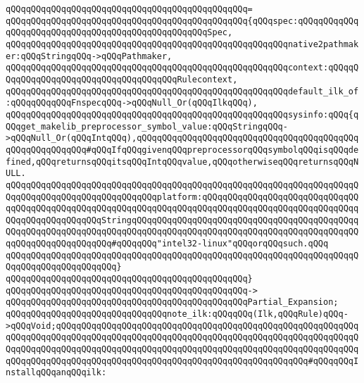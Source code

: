 \verb|qQQqqQQqqQQqqQQqqQQqqQQqqQQqqQQqqQQqqQQqqQQqqQQq=|\newline
\verb|qQQqqQQqqQQqqQQqqQQqqQQqqQQqqQQqqQQqqQQqqQQqqQQq{qQQqspec:qQQqqQQqqQQqqQQqqQQqqQQqqQQqqQQqqQQqqQQqqQQqqQQqqQQqSpec,|\newline
\verb|qQQqqQQqqQQqqQQqqQQqqQQqqQQqqQQqqQQqqQQqqQQqqQQqqQQqqQQqnative2pathmaker:qQQqStringqQQq->qQQqPathmaker,|\newline
\verb|qQQqqQQqqQQqqQQqqQQqqQQqqQQqqQQqqQQqqQQqqQQqqQQqqQQqqQQqcontext:qQQqqQQqqQQqqQQqqQQqqQQqqQQqqQQqqQQqqQQqRulecontext,|\newline
\verb|qQQqqQQqqQQqqQQqqQQqqQQqqQQqqQQqqQQqqQQqqQQqqQQqqQQqqQQqdefault_ilk_of:qQQqqQQqqQQqFnspecqQQq->qQQqNull_Or(qQQqIlkqQQq),|\newline
\newline
\verb|qQQqqQQqqQQqqQQqqQQqqQQqqQQqqQQqqQQqqQQqqQQqqQQqqQQqqQQqsysinfo:qQQq{qQQqget_makelib_preprocessor_symbol_value:qQQqStringqQQq->qQQqNull_Or(qQQqIntqQQq),qQQqqQQqqQQqqQQqqQQqqQQqqQQqqQQqqQQqqQQqqQQqqQQqqQQqqQQqqQQq#qQQqIfqQQqgivenqQQqpreprocessorqQQqsymbolqQQqisqQQqdefined,qQQqreturnsqQQqitsqQQqIntqQQqvalue,qQQqotherwiseqQQqreturnsqQQqNULL.|\newline
\verb|qQQqqQQqqQQqqQQqqQQqqQQqqQQqqQQqqQQqqQQqqQQqqQQqqQQqqQQqqQQqqQQqqQQqqQQqqQQqqQQqqQQqqQQqqQQqqQQqqQQqplatform:qQQqqQQqqQQqqQQqqQQqqQQqqQQqqQQqqQQqqQQqqQQqqQQqqQQqqQQqqQQqqQQqqQQqqQQqqQQqqQQqqQQqqQQqqQQqqQQqqQQqqQQqqQQqqQQqqQQqqQQqStringqQQqqQQqqQQqqQQqqQQqqQQqqQQqqQQqqQQqqQQqqQQqqQQqqQQqqQQqqQQqqQQqqQQqqQQqqQQqqQQqqQQqqQQqqQQqqQQqqQQqqQQqqQQqqQQqqQQqqQQqqQQqqQQqqQQqqQQq#qQQqqQQq"intel32-linux"qQQqorqQQqsuch.qQQq|\newline
\verb|qQQqqQQqqQQqqQQqqQQqqQQqqQQqqQQqqQQqqQQqqQQqqQQqqQQqqQQqqQQqqQQqqQQqqQQqqQQqqQQqqQQqqQQqqQQq}|\newline
\verb|qQQqqQQqqQQqqQQqqQQqqQQqqQQqqQQqqQQqqQQqqQQqqQQq}|\newline
\verb|qQQqqQQqqQQqqQQqqQQqqQQqqQQqqQQqqQQqqQQqqQQqqQQq->|\newline
\verb|qQQqqQQqqQQqqQQqqQQqqQQqqQQqqQQqqQQqqQQqqQQqqQQqPartial_Expansion;|\newline
\newline
\verb|qQQqqQQqqQQqqQQqqQQqqQQqqQQqqQQqnote_ilk:qQQqqQQq(Ilk,qQQqRule)qQQq->qQQqVoid;qQQqqQQqqQQqqQQqqQQqqQQqqQQqqQQqqQQqqQQqqQQqqQQqqQQqqQQqqQQqqQQqqQQqqQQqqQQqqQQqqQQqqQQqqQQqqQQqqQQqqQQqqQQqqQQqqQQqqQQqqQQqqQQqqQQqqQQqqQQqqQQqqQQqqQQqqQQqqQQqqQQqqQQqqQQqqQQqqQQqqQQqqQQqqQQqqQQqqQQqqQQqqQQqqQQqqQQqqQQqqQQqqQQqqQQqqQQqqQQqqQQqqQQqqQQqqQQqqQQq#qQQqqQQqInstallqQQqanqQQqilk:|\newline

